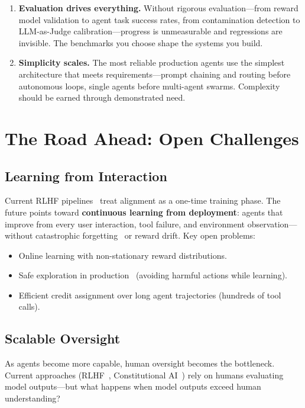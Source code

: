 \begin{enumerate}
  \item \textbf{Evaluation drives everything.} Without rigorous evaluation---from reward model validation to agent task success rates, from contamination detection to LLM-as-Judge calibration---progress is unmeasurable and regressions are invisible. The benchmarks you choose shape the systems you build.
  \item \textbf{Simplicity scales.} The most reliable production agents use the simplest architecture that meets requirements---prompt chaining and routing before autonomous loops, single agents before multi-agent swarms. Complexity should be earned through demonstrated need.
\end{enumerate}

\section{The Road Ahead: Open Challenges}
\label{the-road-ahead-open-challenges}

\subsection{Learning from Interaction}
\label{learning-from-interaction}

Current RLHF pipelines~\cite{ouyang2022training} treat alignment as a one-time training phase. The future points toward \textbf{continuous learning from deployment}: agents that improve from every user interaction, tool failure, and environment observation---without catastrophic forgetting~\cite{kirkpatrick2017overcoming} or reward drift. Key open problems:

\begin{itemize}
  \item Online learning with non-stationary reward distributions.
  \item Safe exploration in production~\cite{garcia2015comprehensive} (avoiding harmful actions while learning).
  \item Efficient credit assignment over long agent trajectories (hundreds of tool calls).
\end{itemize}

\subsection{Scalable Oversight}
\label{scalable-oversight}

As agents become more capable, human oversight becomes the bottleneck. Current approaches (RLHF~\cite{ouyang2022training}, Constitutional AI~\cite{bai2022constitutional}) rely on humans evaluating model outputs---but what happens when model outputs exceed human understanding?

